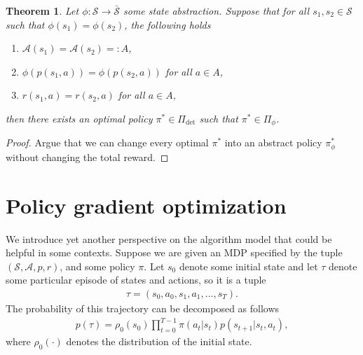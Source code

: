 \documentclass[11pt,a4paper]{article}
\newtheorem{theorem}{Theorem}[section]
\theoremstyle{remark}
\newcommand\note[1]{{\color{Navy}\noindent\scriptsize#1}}
\begin{document}
\begin{theorem}
  Let $\phi : \mathcal{S} \rightarrow \bar{\mathcal{S}}$ some state abstraction. Suppose that for all $s_1, s_2 \in \mathcal{S}$ such that $\phi(s_1) = \phi(s_2)$, the following holds
  \begin{enumerate}
    \item $\mathcal{A}(s_1) = \mathcal{A}(s_2) =: A$,
    \item $\phi(p(s_1, a)) = \phi(p(s_2, a))$ for all $a \in A$,
    \item $r(s_1, a) = r(s_2, a)$ for all $a \in A$,
  \end{enumerate}
  then there exists an optimal policy $\pi^* \in \Pi_\text{det}$ such that
  $\pi^* \in \Pi_\phi$.
\end{theorem}
\begin{proof}
  Argue that we can change every optimal $\pi^*$ into an abstract policy $\pi^*_\phi$
  without changing the total reward.
\end{proof}

\section{Policy gradient optimization}\label{sec:policy-gradient}

\note{
We introduce yet another perspective on the algorithm model that could
be helpful in some contexts.
%
Suppose we are given an MDP specified by the tuple
$(\mathcal{S}, \mathcal{A}, p, r)$, and some policy $\pi$.
%
Let $s_0$ denote some initial state and let $\tau$ denote some particular episode
of states and actions, so it is a tuple
\begin{align}
  \tau = (s_0, a_0, s_1, a_1, \dots, s_T) .
\end{align}
The probability of this trajectory can be decomposed as follows
\begin{align}
  \label{eq:7}
  p(\tau) = \rho_0(s_0) \prod_{t=0}^{T-1} \pi(a_t | s_t) p(s_{t+1} | s_t, a_t) ,
\end{align}
where $\rho_0(\cdot)$ denotes the distribution of the initial state.}
\end{document}
